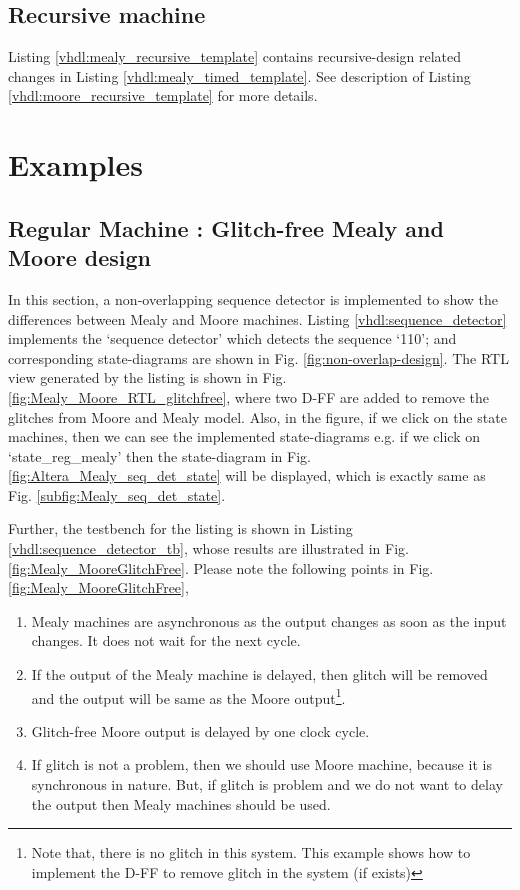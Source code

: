 \subsection{Recursive machine}

Listing \ref{vhdl:mealy_recursive_template} contains recursive-design related changes in Listing \ref{vhdl:mealy_timed_template}. See description of Listing \ref{vhdl:moore_recursive_template} for more details. 



\section{Examples} \label{sec:VHDLtemplateExample}

\subsection{Regular Machine : Glitch-free Mealy and Moore design} \label{sec:exampleRegularMMGlitchFree}
In this section, a non-overlapping sequence detector is implemented to show the differences between Mealy and Moore machines. Listing \ref{vhdl:sequence_detector} implements the `sequence detector' which detects the sequence `110'; and corresponding state-diagrams are shown in Fig. \ref{fig:non-overlap-design}. The RTL view generated by the listing is shown in Fig. \ref{fig:Mealy_Moore_RTL_glitchfree}, where two D-FF are added to remove the glitches from Moore and Mealy model. Also, in the figure, if we click on the state machines, then we can see the implemented state-diagrams e.g. if we click on `state\_reg\_mealy' then the state-diagram in Fig. \ref{fig:Altera_Mealy_seq_det_state} will be displayed, which is exactly same as Fig. \ref{subfig:Mealy_seq_det_state}. 


Further, the testbench for the listing is shown in Listing \ref{vhdl:sequence_detector_tb}, whose results are illustrated in Fig. \ref{fig:Mealy_MooreGlitchFree}. Please note the following points in Fig. \ref{fig:Mealy_MooreGlitchFree},
\begin{enumerate}
	\item Mealy machines are asynchronous as the output changes as soon as the input changes. It does not wait for the next cycle. 
	\item If the output of the Mealy machine is delayed, then glitch will be removed and the output will be same as the Moore output\footnote{Note that, there is no glitch in this system. This example shows how to implement the D-FF to remove glitch in the system (if exists)}. 
	\item Glitch-free Moore output is delayed by one clock cycle. 
	\item If glitch is not a problem, then we should use Moore machine, because it is synchronous in nature. But, if glitch is problem and we do not want to delay the output then Mealy machines should be used. 
\end{enumerate}

